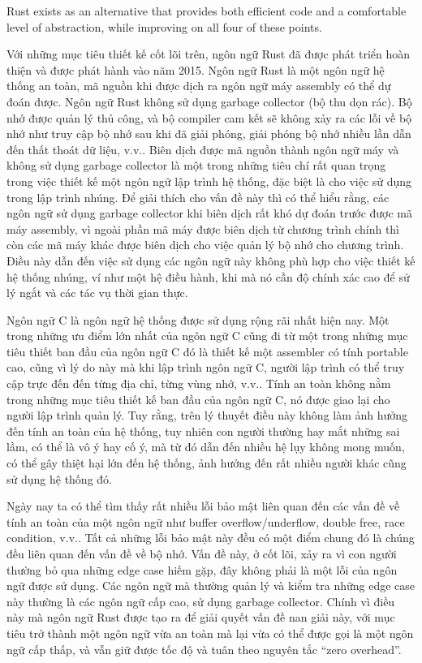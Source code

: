 Rust exists as an alternative that provides both efficient code and a comfortable level of abstraction, while improving on all four of these points.

\bigskip

Với những mục tiêu thiết kế cốt lõi trên, ngôn ngữ Rust đã được phát triển hoàn thiện và được phát hành vào năm 2015.
Ngôn ngữ Rust là một ngôn ngữ hệ thống an toàn, mã nguồn khi được dịch ra ngôn ngữ máy assembly có thể dự đoán được.
Ngôn ngữ Rust không sử dụng garbage collector (bộ thu dọn rác). Bộ nhớ được quản lý thủ công, và bộ compiler cam kết sẽ không xảy ra các lỗi về bộ nhớ như truy cập bộ nhớ sau khi đã giải phóng, giải phóng bộ nhớ nhiều lần dẫn đến thất thoát dữ liệu, v.v..
Biên dịch được mã nguồn thành ngôn ngữ máy và không sử dụng garbage collector là một trong những tiêu chí rất quan trọng trong việc thiết kế một ngôn ngữ lập trình hệ thống, đặc biệt là cho việc sử dụng trong lập trình nhúng.
Để giải thích cho vấn đề này thì có thể hiểu rằng, các ngôn ngữ sử dụng garbage collector khi biên dịch rất khó dự đoán trước được mã máy assembly, vì ngoài phần mã máy được biên dịch từ chương trình chính thì còn các mã máy khác được biên dịch cho việc quản lý bộ nhớ cho chương trình.
Điều này dẫn đến việc sử dụng các ngôn ngữ này không phù hợp cho việc thiết kế hệ thống nhúng, ví như một hệ điều hành, khi mà nó cần độ chính xác cao để sử lý ngắt và các tác vụ thời gian thực.

Ngôn ngữ C là ngôn ngữ hệ thống được sử dụng rộng rãi nhất hiện nay. Một trong những ưu điểm lớn nhất của ngôn ngữ C cũng đi từ một trong những mục tiêu thiết ban đầu của ngôn ngữ C đó là thiết kế một assembler có tính portable cao, cũng vì lý do này mà khi lập trình ngôn ngữ C, người lập trình có thể truy cập trực đến đến từng địa chỉ, từng vùng nhớ, v.v.. Tính an toàn không nằm trong những mục tiêu thiết kế ban đầu của ngôn ngữ C, nó được giao lại cho người lập trình quản lý. Tuy rằng, trên lý thuyết điều này không làm ảnh hưởng đến tính an toàn của hệ thống, tuy nhiên con người thường hay mắt những sai lầm, có thể là vô ý hay cố ý, mà từ đó dẫn đến nhiều hệ lụy không mong muốn, có thể gây thiệt hại lớn đến hệ thống, ảnh hưởng đến rất nhiều người khác cũng sử dụng hệ thống đó.

Ngày nay ta có thể tìm thấy rất nhiều lỗi bảo mật liên quan đến các vấn đề về tính an toàn của một ngôn ngữ như buffer overflow/underflow, double free, race condition, v.v.. Tất cả những lỗi bảo mật này đều có một điểm chung đó là chúng đều liên quan đến vấn đề về bộ nhớ. Vấn đề này, ở cốt lõi, xảy ra vì con người thường bỏ qua những edge case hiếm gặp, đây không phải là một lỗi của ngôn ngữ được sử dụng. Các ngôn ngữ mà thường quản lý và kiểm tra những edge case này thường là các ngôn ngữ cấp cao, sử dụng garbage collector. Chính vì điều này mà ngôn ngữ Rust được tạo ra để giải quyết vấn đề nan giải này, với mục tiêu trở thành một ngôn ngữ vừa an toàn mà lại vừa có thể được gọi là một ngôn ngữ cấp thấp, và vẫn giữ được tốc độ và tuân theo nguyên tắc ``zero overhead''.

